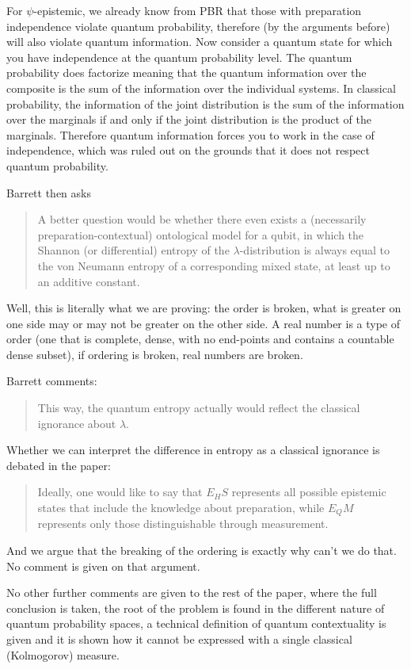 \documentclass[11pt]{article}
\begin{document}
For $\psi$-epistemic, we already know from PBR that those with preparation independence violate quantum probability, therefore (by the arguments before) will also violate quantum information. Now consider a quantum state for which you have independence at the quantum probability level. The quantum probability does factorize meaning that the quantum information over the composite is the sum of the information over the individual systems. In classical probability, the information of the joint distribution is the sum of the information over the marginals if and only if the joint distribution is the product of the marginals. Therefore quantum information forces you to work in the case of independence, which was ruled out on the grounds that it does not respect quantum probability.

Barrett then asks
\begin{quote}
A better question would be whether there even exists a
(necessarily preparation-contextual) ontological model for a qubit, in which the
Shannon (or differential) entropy of the $\lambda$-distribution is always equal to
the von Neumann entropy of a corresponding mixed state, at least up to an
additive constant. 
\end{quote}
Well, this is literally what we are proving: the order is broken, what is greater on one side may or may not be greater on the other side. A real number is a type of order (one that is complete, dense, with no end-points and contains a countable dense subset), if ordering is broken, real numbers are broken.

Barrett comments:
\begin{quote}
This way, the quantum entropy actually would reflect the
classical ignorance about $\lambda$.
\end{quote}
Whether we can interpret the difference in entropy as a classical ignorance is debated in the paper:
\begin{quote}
Ideally, one would like to say that $E_HS$ represents
all possible epistemic states that include the knowledge
about preparation, while $E_QM$ represents only those distinguishable
through measurement.
\end{quote}
And we argue that the breaking of the ordering is exactly why can't we do that. No comment is given on that argument.

No other further comments are given to the rest of the paper, where the full conclusion is taken, the root of the problem is found in the different nature of quantum probability spaces, a technical definition of quantum contextuality is given and it is shown how it cannot be expressed with a single classical (Kolmogorov) measure.
\end{document}

